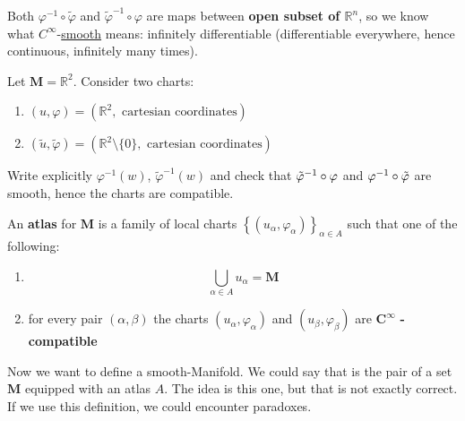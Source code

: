 \documentclass[../main.tex]{subfiles}
\begin{document}
\begin{kaobox}[frametitle=Notice]
Both $\varphi^{-1}\circ\tilde{\varphi}$ and $\tilde{\varphi}^{-1}\circ\varphi$ are maps between \textbf{open subset of $\mathbb{R}^n$}, so we know what $C^\infty$-\href{https://it.wikipedia.org/wiki/Funzione_liscia}{smooth} means: infinitely differentiable (differentiable everywhere, hence continuous, infinitely many times).
\end{kaobox}
\begin{example}[easy]
Let $\mathbf{M}=\mathbb{R}^2$. Consider two charts:
\begin{enumerate}
    \item \((u,\varphi)=(\mathbb{R}^2, \textrm{ cartesian coordinates})\)
    \item \((\tilde{u},\tilde{\varphi})=(\mathbb{R}^2\setminus\{0\}, \textrm{ cartesian coordinates})\)
\end{enumerate}
Write explicitly $\varphi^{-1}(w)$, $\tilde{\varphi}^{-1}(w)$ and check that $\Tilde{\varphi}^{-1}\circ{\varphi}$ and $\varphi^{-1}\circ\Tilde{\varphi}$ are smooth, hence the charts are compatible.
\end{example}
\begin{definition}
An \textbf{atlas} for $\mathbf{M}$ is a family of local charts \(\left\{(u_{\alpha},\varphi_{\alpha})\right\}_{\alpha\in A}\) such that one of the following:
\begin{enumerate}
    \item $$\bigcup_{\alpha\in A}u_{\alpha}=\mathbf{M}$$
    \item for every pair $(\alpha,\beta)$ the charts $(u_{\alpha},\varphi_{\alpha})$ and $(u_{\beta},\varphi_{\beta})$ are $\mathbf{C}^{\infty}$ \textbf{-compatible}
\end{enumerate}
\end{definition}
Now we want to define a smooth-Manifold. We could say that is the pair of a set $\mathbf{M}$ equipped with an atlas $A$. The idea is this one, but that is not exactly correct. If we use this definition, we could encounter paradoxes.
\end{document}
